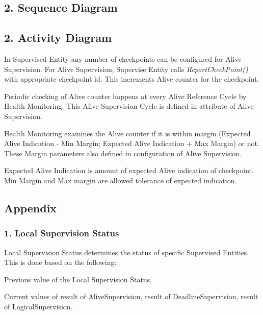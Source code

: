 \subsection*{2. Sequence Diagram}

 \subsection*{2. Activity Diagram}


\begin{DoxyItemize}
\item In Supervised Entity any number of checkpoints can be configured for Alive Supervision. For Alive Supervision, Supervise Entity calls {\itshape Report\+Check\+Point()} with appropriate checkpoint id. This increments Alive counter for the checkpoint.
\item Periodic checking of Alive counter happens at every Alive Reference Cycle by Health Monitoring. This Alive Supervision Cycle is defined in attribute of Alive Supervision.
\item Health Monitoring examines the Alive counter if it is within margin (Expected Alive Indication -\/ Min Margin; Expected Alive Indication + Max Margin) or not. These Margin parameters also defined in configuration of Alive Supervision.
\item Expected Alive Indication is amount of expected Alive indication of checkpoint. Min Margin and Max margin are allowed tolerance of expected indication. 
\end{DoxyItemize}\hypertarget{Appendix}{}\subsection{Appendix}\label{Appendix}
\hypertarget{_appendix_Local_Supervision_Status}{}\subsubsection{1. Local Supervision Status}\label{_appendix_Local_Supervision_Status}
\label{_appendix_LocalSupervisionStatus}%
%
 Local Supervision Status determines the status of specific Supervised Entities. This is done based on the following\+:
\begin{DoxyItemize}
\item Previous value of the Local Supervision Status,
\item Current values of result of Alive\+Supervision, result of Deadline\+Supervision, result of Logical\+Supervision.
\end{DoxyItemize}


